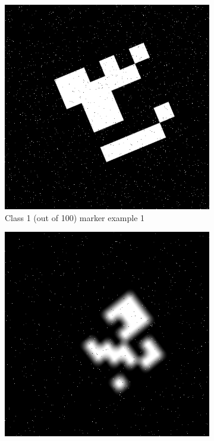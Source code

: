 \documentclass[conference]{IEEEtran}
\begin{document}
\begin{figure}[h]
  \vspace{0.5cm}
  
  \begin{subfigure}[b]{0.2\textwidth}
      \centering
      \includegraphics[width=\textwidth]{images/aruco-file3-classification-3.png}
      \caption{Class 1 (out of 100) marker example 1}
      \label{fig:class_ex3}
  \end{subfigure}
  \hfill
  \begin{subfigure}[b]{0.2\textwidth}
      \centering
      \includegraphics[width=\textwidth]{images/aruco-file3-classification-4.png}

\end{subfigure}
\end{figure}
\end{document}
